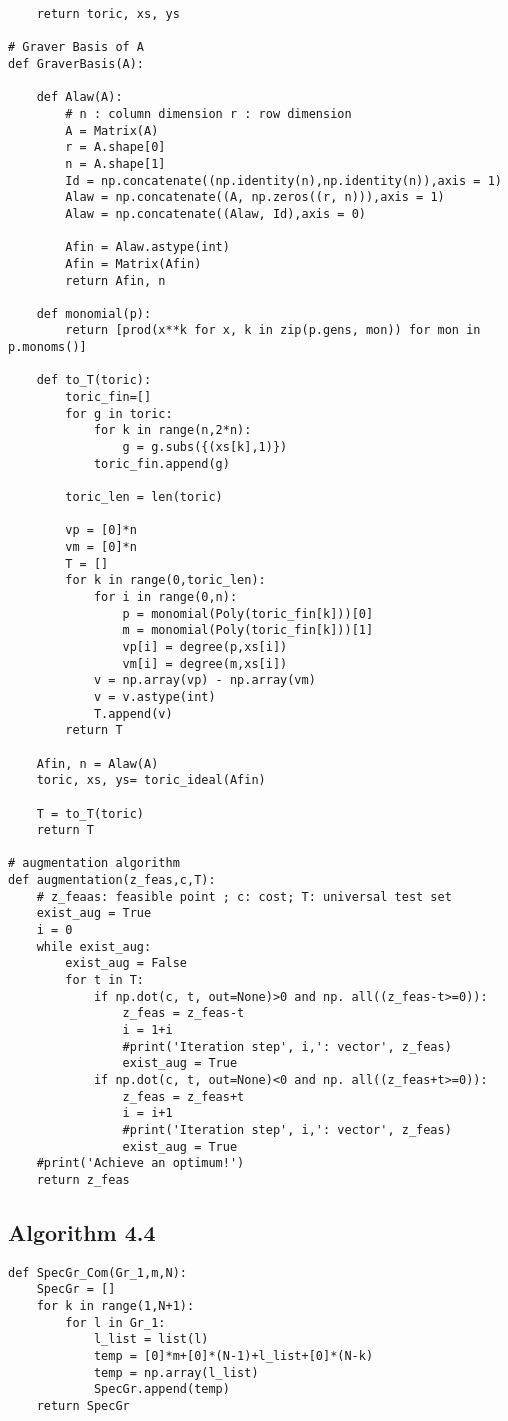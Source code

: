 \documentclass{article}
\theoremstyle{plain}
\theoremstyle{definition}
\begin{document}
\begin{propsition}
\begin{verbatim}
    return toric, xs, ys
    
# Graver Basis of A
def GraverBasis(A):

    def Alaw(A):
        # n : column dimension r : row dimension
        A = Matrix(A)
        r = A.shape[0]
        n = A.shape[1]
        Id = np.concatenate((np.identity(n),np.identity(n)),axis = 1)
        Alaw = np.concatenate((A, np.zeros((r, n))),axis = 1)
        Alaw = np.concatenate((Alaw, Id),axis = 0)

        Afin = Alaw.astype(int)
        Afin = Matrix(Afin)
        return Afin, n

    def monomial(p):
        return [prod(x**k for x, k in zip(p.gens, mon)) for mon in p.monoms()]

    def to_T(toric):
        toric_fin=[]
        for g in toric:
            for k in range(n,2*n):
                g = g.subs({(xs[k],1)})
            toric_fin.append(g)

        toric_len = len(toric)

        vp = [0]*n
        vm = [0]*n
        T = []
        for k in range(0,toric_len):
            for i in range(0,n):
                p = monomial(Poly(toric_fin[k]))[0]
                m = monomial(Poly(toric_fin[k]))[1]
                vp[i] = degree(p,xs[i])
                vm[i] = degree(m,xs[i])
            v = np.array(vp) - np.array(vm)
            v = v.astype(int)
            T.append(v)
        return T

    Afin, n = Alaw(A)
    toric, xs, ys= toric_ideal(Afin)

    T = to_T(toric)
    return T

# augmentation algorithm
def augmentation(z_feas,c,T):
    # z_feaas: feasible point ; c: cost; T: universal test set
    exist_aug = True
    i = 0
    while exist_aug:
        exist_aug = False
        for t in T:
            if np.dot(c, t, out=None)>0 and np. all((z_feas-t>=0)):
                z_feas = z_feas-t
                i = 1+i
                #print('Iteration step', i,': vector', z_feas)
                exist_aug = True
            if np.dot(c, t, out=None)<0 and np. all((z_feas+t>=0)):
                z_feas = z_feas+t
                i = i+1
                #print('Iteration step', i,': vector', z_feas)
                exist_aug = True
    #print('Achieve an optimum!')
    return z_feas
\end{verbatim}

\subsection{Algorithm 4.4}
\begin{verbatim}
def SpecGr_Com(Gr_1,m,N):
    SpecGr = []
    for k in range(1,N+1):
        for l in Gr_1:
            l_list = list(l)
            temp = [0]*m+[0]*(N-1)+l_list+[0]*(N-k)
            temp = np.array(l_list)
            SpecGr.append(temp)
    return SpecGr
\end{verbatim}


\end{propsition}
\end{document}
